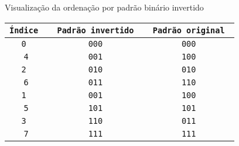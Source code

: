 \begin{frame}[fragile]{Visualização da ordenação por padrão binário invertido}

    \begin{table}
    \centering
    \begin{tabular}{>{\tt}c>{\tt}c>{\tt}c}
        \toprule
        \textbf{Índice} & \textbf{Padrão invertido} & \textbf{Padrão original} \\
        \midrule
            0 & 000 & 000 \\ 
            \rowcolor[gray]{0.9}
            4 & 001 & 100 \\ 
            2 & 010 & 010 \\ 
            \rowcolor[gray]{0.9}
            6 & 011 & 110 \\ 
            1 & 001 & 100 \\ 
            \rowcolor[gray]{0.9}
            5 & 101 & 101 \\ 
            3 & 110 & 011 \\ 
            \rowcolor[gray]{0.9}
            7 & 111 & 111 \\ 
    \end{tabular}
    \end{table}

\end{frame}
